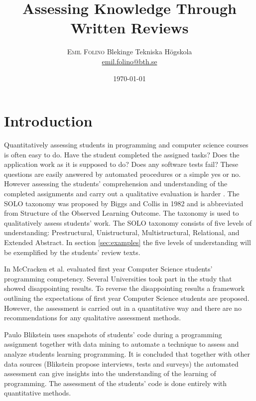 \documentclass[twoside,twocolumn,a4paper,11pt,english]{article}
\title{Assessing Knowledge Through Written Reviews} %
\author{%
\textsc{Emil Folino} %
\normalsize Blekinge Tekniska Högskola \\ %
\normalsize \href{mailto:emil.folino@bth.se}{emil.folino@bth.se} %
}
\date{\today} %
\begin{document}
\maketitle


\section{Introduction}
Quantitatively assessing students in programming and computer science courses is often easy to do. Have the student completed the assigned tasks? Does the application work as it is supposed to do? Does any software tests fail? These questions are easily answered by automated procedures or a simple yes or no. However assessing the students' comprehension and understanding of the completed assignments and carry out a qualitative evaluation is harder \cite{biggs1982evaluation}. The SOLO taxonomy was proposed by Biggs and Collis in 1982 and is abbreviated from Structure of the Observed Learning Outcome. The taxonomy is used to qualitatively assess students' work. The SOLO taxonomy consists of five levels of understanding: Prestructural, Unistructural, Multistructural, Relational, and Extended Abstract. In section \ref{sec:examples} the five levels of understanding will be exemplified by the students' review texts.

In \cite{mccracken2001multi} McCracken et al. evaluated first year Computer Science students' programming competency. Several Universities took part in the study that showed disappointing results. To reverse the disappointing results a framework outlining the expectations of first year Computer Science students are proposed. However, the assessment is carried out in a quantitative way and there are no recommendations for any qualitative assessment methods.

Paulo Blikstein \cite{Blikstein} uses snapshots of students' code during a programming assignment together with data mining to automate a technique to assess and analyze students learning programming. It is concluded that together with other data sources (Blikstein propose interviews, tests and surveys) the automated assessment can give insights into the understanding of the learning of programming. The assessment of the students' code is done entirely with quantitative methods.
\end{document}
